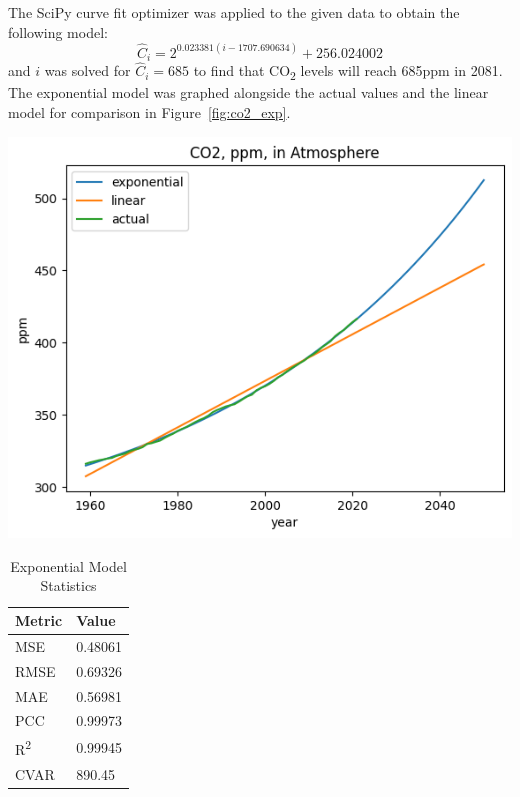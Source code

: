 \documentclass[12pt]{mcmthesis}
\begin{document}
    The SciPy curve fit optimizer was applied to the given data to obtain the following model:
%
    \begin{equation}
        \hat C_i = 2^{0.023381 (i - 1707.690634)} + 256.024002
        \label{eq:co2_exp}
    \end{equation}
%
    and $i$ was solved for $\hat C_i = 685$ to find that CO\textsubscript{2} levels will reach 685\si{ppm} in 2081.
    The exponential model was graphed alongside the actual values and the linear model for comparison in Figure~\ref{fig:co2_exp}.

    \begin{table}[h]
        \begin{minipage}{0.7\linewidth}
            \centering
            \includegraphics[width=\textwidth]{exponential}%
            \label{fig:co2_exp}
        \end{minipage}%
        \begin{minipage}{0.3\linewidth}
            \centering
            \begin{tabular}{ll}
                \toprule
                Metric               & Value   \\
                \midrule
                MSE                  & 0.48061 \\
                RMSE                 & 0.69326 \\
                MAE                  & 0.56981 \\
                PCC                  & 0.99973 \\
                R\textsuperscript{2} & 0.99945 \\
                CVAR                 & 890.45  \\
                \bottomrule
            \end{tabular}
            \vspace{8pt}
            \caption{Exponential Model Statistics}
            \label{tab:co2_exp_err}
        \end{minipage}
    \end{table}
\end{document}
